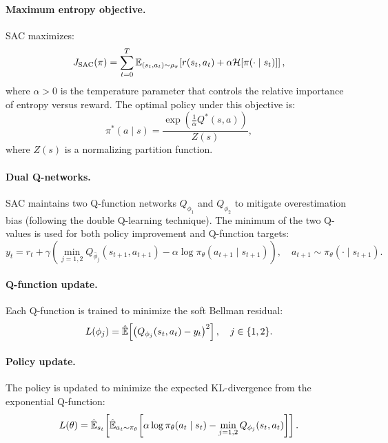 \paragraph{Maximum entropy objective.} SAC maximizes:
\begin{equation}
    J_{\text{SAC}}(\pi) = \sum_{t=0}^{T} \mathbb{E}_{(s_t, a_t) \sim \rho_\pi}\!\left[r(s_t, a_t) + \alpha \mathcal{H}[\pi(\cdot \mid s_t)]\right],
    \label{eq:sac_obj}
\end{equation}
where $\alpha > 0$ is the temperature parameter that controls the relative importance of entropy versus reward. The optimal policy under this objective is:
\begin{equation}
    \pi^{*}(a \mid s) = \frac{\exp\!\left(\frac{1}{\alpha} Q^{*}(s, a)\right)}{Z(s)},
\end{equation}
where $Z(s)$ is a normalizing partition function.

\paragraph{Dual Q-networks.} SAC maintains two Q-function networks $Q_{\phi_1}$ and $Q_{\phi_2}$ to mitigate overestimation bias (following the double Q-learning technique). The minimum of the two Q-values is used for both policy improvement and Q-function targets:
\begin{equation}
    y_t = r_t + \gamma \left(\min_{j=1,2} Q_{\bar{\phi}_j}(s_{t+1}, a_{t+1}) - \alpha \log \pi_\theta(a_{t+1} \mid s_{t+1})\right), \quad a_{t+1} \sim \pi_\theta(\cdot \mid s_{t+1}).
    \label{eq:sac_target}
\end{equation}

\paragraph{Q-function update.} Each Q-function is trained to minimize the soft Bellman residual:
\begin{equation}
    L(\phi_j) = \hat{\mathbb{E}}\!\left[\left(Q_{\phi_j}(s_t, a_t) - y_t\right)^2\right], \quad j \in \{1, 2\}.
\end{equation}

\paragraph{Policy update.} The policy is updated to minimize the expected KL-divergence from the exponential Q-function:
\begin{equation}
    L(\theta) = \hat{\mathbb{E}}_{s_t}\!\left[\hat{\mathbb{E}}_{a_t \sim \pi_\theta}\!\left[\alpha \log \pi_\theta(a_t \mid s_t) - \min_{j=1,2} Q_{\phi_j}(s_t, a_t)\right]\right].
    \label{eq:sac_policy}
\end{equation}

